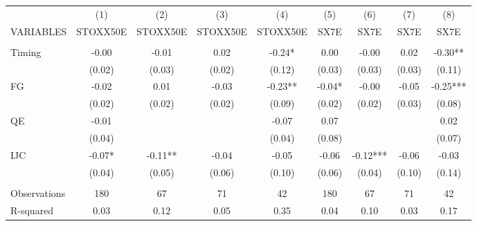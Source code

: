 \begin{tabular}{lcccccccc} \hline
 & (1) & (2) & (3) & (4) & (5) & (6) & (7) & (8) \\
VARIABLES & STOXX50E & STOXX50E & STOXX50E & STOXX50E & SX7E & SX7E & SX7E & SX7E \\ \hline
 &  &  &  &  &  &  &  &  \\
Timing & -0.00 & -0.01 & 0.02 & -0.24* & 0.00 & -0.00 & 0.02 & -0.30** \\
 & (0.02) & (0.03) & (0.02) & (0.12) & (0.03) & (0.03) & (0.03) & (0.11) \\
FG & -0.02 & 0.01 & -0.03 & -0.23** & -0.04* & -0.00 & -0.05 & -0.25*** \\
 & (0.02) & (0.02) & (0.02) & (0.09) & (0.02) & (0.02) & (0.03) & (0.08) \\
QE & -0.01 &  &  & -0.07 & 0.07 &  &  & 0.02 \\
 & (0.04) &  &  & (0.04) & (0.08) &  &  & (0.07) \\
IJC & -0.07* & -0.11** & -0.04 & -0.05 & -0.06 & -0.12*** & -0.06 & -0.03 \\
 & (0.04) & (0.05) & (0.06) & (0.10) & (0.06) & (0.04) & (0.10) & (0.14) \\
 &  &  &  &  &  &  &  &  \\
Observations & 180 & 67 & 71 & 42 & 180 & 67 & 71 & 42 \\
 R-squared & 0.03 & 0.12 & 0.05 & 0.35 & 0.04 & 0.10 & 0.03 & 0.17 \\ \hline
\end{tabular}
